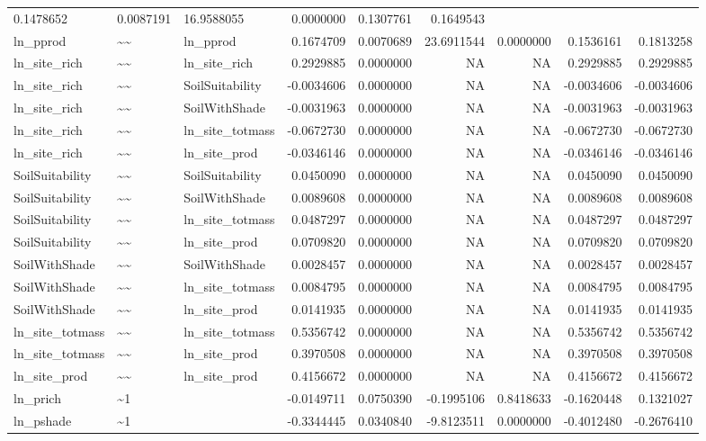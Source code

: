 \documentclass[ignorenonframetext,]{beamer}
\begin{document}
\begin{frame}
\begin{longtable}[]{@{}lllrrrrrr@{}}
0.1478652 & 0.0087191 & 16.9588055 & 0.0000000 & 0.1307761 &
0.1649543\tabularnewline
ln\_pprod & \textasciitilde{}\textasciitilde{} & ln\_pprod & 0.1674709 &
0.0070689 & 23.6911544 & 0.0000000 & 0.1536161 &
0.1813258\tabularnewline
ln\_site\_rich & \textasciitilde{}\textasciitilde{} & ln\_site\_rich &
0.2929885 & 0.0000000 & NA & NA & 0.2929885 & 0.2929885\tabularnewline
ln\_site\_rich & \textasciitilde{}\textasciitilde{} & SoilSuitability &
-0.0034606 & 0.0000000 & NA & NA & -0.0034606 &
-0.0034606\tabularnewline
ln\_site\_rich & \textasciitilde{}\textasciitilde{} & SoilWithShade &
-0.0031963 & 0.0000000 & NA & NA & -0.0031963 &
-0.0031963\tabularnewline
ln\_site\_rich & \textasciitilde{}\textasciitilde{} & ln\_site\_totmass
& -0.0672730 & 0.0000000 & NA & NA & -0.0672730 &
-0.0672730\tabularnewline
ln\_site\_rich & \textasciitilde{}\textasciitilde{} & ln\_site\_prod &
-0.0346146 & 0.0000000 & NA & NA & -0.0346146 &
-0.0346146\tabularnewline
SoilSuitability & \textasciitilde{}\textasciitilde{} & SoilSuitability &
0.0450090 & 0.0000000 & NA & NA & 0.0450090 & 0.0450090\tabularnewline
SoilSuitability & \textasciitilde{}\textasciitilde{} & SoilWithShade &
0.0089608 & 0.0000000 & NA & NA & 0.0089608 & 0.0089608\tabularnewline
SoilSuitability & \textasciitilde{}\textasciitilde{} & ln\_site\_totmass
& 0.0487297 & 0.0000000 & NA & NA & 0.0487297 & 0.0487297\tabularnewline
SoilSuitability & \textasciitilde{}\textasciitilde{} & ln\_site\_prod &
0.0709820 & 0.0000000 & NA & NA & 0.0709820 & 0.0709820\tabularnewline
SoilWithShade & \textasciitilde{}\textasciitilde{} & SoilWithShade &
0.0028457 & 0.0000000 & NA & NA & 0.0028457 & 0.0028457\tabularnewline
SoilWithShade & \textasciitilde{}\textasciitilde{} & ln\_site\_totmass &
0.0084795 & 0.0000000 & NA & NA & 0.0084795 & 0.0084795\tabularnewline
SoilWithShade & \textasciitilde{}\textasciitilde{} & ln\_site\_prod &
0.0141935 & 0.0000000 & NA & NA & 0.0141935 & 0.0141935\tabularnewline
ln\_site\_totmass & \textasciitilde{}\textasciitilde{} &
ln\_site\_totmass & 0.5356742 & 0.0000000 & NA & NA & 0.5356742 &
0.5356742\tabularnewline
ln\_site\_totmass & \textasciitilde{}\textasciitilde{} & ln\_site\_prod
& 0.3970508 & 0.0000000 & NA & NA & 0.3970508 & 0.3970508\tabularnewline
ln\_site\_prod & \textasciitilde{}\textasciitilde{} & ln\_site\_prod &
0.4156672 & 0.0000000 & NA & NA & 0.4156672 & 0.4156672\tabularnewline
ln\_prich & \textasciitilde{}1 & & -0.0149711 & 0.0750390 & -0.1995106 &
0.8418633 & -0.1620448 & 0.1321027\tabularnewline
ln\_pshade & \textasciitilde{}1 & & -0.3344445 & 0.0340840 & -9.8123511
& 0.0000000 & -0.4012480 & -0.2676410\tabularnewline

\end{longtable}
\end{frame}
\end{document}
